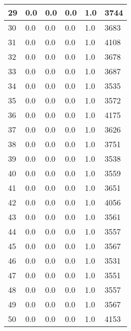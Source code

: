 \begin{longtable}{|l|l|l|l|l|l|}
29 & 0.0 & 0.0 & 0.0 & 1.0 & 3744 \\ \hline 
30 & 0.0 & 0.0 & 0.0 & 1.0 & 3683 \\ \hline 
31 & 0.0 & 0.0 & 0.0 & 1.0 & 4108 \\ \hline 
32 & 0.0 & 0.0 & 0.0 & 1.0 & 3678 \\ \hline 
33 & 0.0 & 0.0 & 0.0 & 1.0 & 3687 \\ \hline 
34 & 0.0 & 0.0 & 0.0 & 1.0 & 3535 \\ \hline 
35 & 0.0 & 0.0 & 0.0 & 1.0 & 3572 \\ \hline 
36 & 0.0 & 0.0 & 0.0 & 1.0 & 4175 \\ \hline 
37 & 0.0 & 0.0 & 0.0 & 1.0 & 3626 \\ \hline 
38 & 0.0 & 0.0 & 0.0 & 1.0 & 3751 \\ \hline 
39 & 0.0 & 0.0 & 0.0 & 1.0 & 3538 \\ \hline 
40 & 0.0 & 0.0 & 0.0 & 1.0 & 3559 \\ \hline 
41 & 0.0 & 0.0 & 0.0 & 1.0 & 3651 \\ \hline 
42 & 0.0 & 0.0 & 0.0 & 1.0 & 4056 \\ \hline 
43 & 0.0 & 0.0 & 0.0 & 1.0 & 3561 \\ \hline 
44 & 0.0 & 0.0 & 0.0 & 1.0 & 3557 \\ \hline 
45 & 0.0 & 0.0 & 0.0 & 1.0 & 3567 \\ \hline 
46 & 0.0 & 0.0 & 0.0 & 1.0 & 3531 \\ \hline 
47 & 0.0 & 0.0 & 0.0 & 1.0 & 3551 \\ \hline 
48 & 0.0 & 0.0 & 0.0 & 1.0 & 3557 \\ \hline 
49 & 0.0 & 0.0 & 0.0 & 1.0 & 3567 \\ \hline 
50 & 0.0 & 0.0 & 0.0 & 1.0 & 4153 \\ \hline 
\end{longtable}